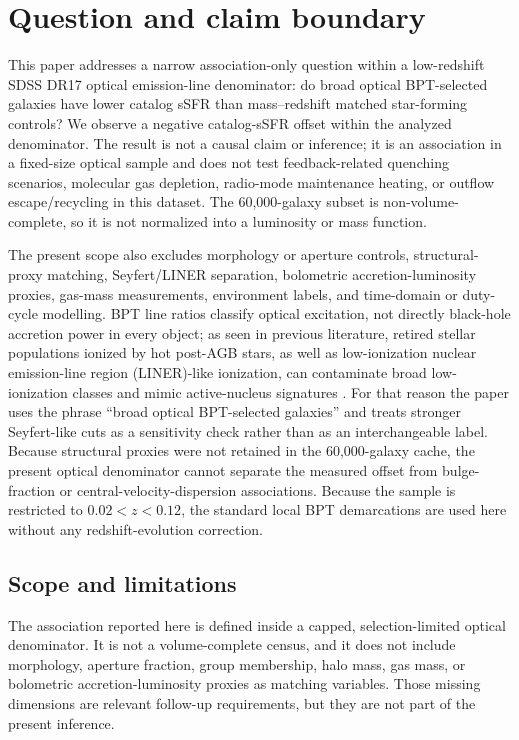 \documentclass[twocolumn]{aastex631}
\begin{document}

\section{Question and claim boundary}
This paper addresses a narrow association-only question within a low-redshift SDSS DR17 optical emission-line denominator: do broad optical BPT-selected galaxies have lower catalog sSFR than mass--redshift matched star-forming controls? We observe a negative catalog-sSFR offset within the analyzed denominator. The result is not a causal claim or inference; it is an association in a fixed-size optical sample and does not test feedback-related quenching scenarios, molecular gas depletion, radio-mode maintenance heating, or outflow escape/recycling in this dataset. The 60,000-galaxy subset is non-volume-complete, so it is not normalized into a luminosity or mass function.


The present scope also excludes morphology or aperture controls, structural-proxy matching, Seyfert/LINER separation, bolometric accretion-luminosity proxies, gas-mass measurements, environment labels, and time-domain or duty-cycle modelling. BPT line ratios classify optical excitation, not directly black-hole accretion power in every object; as seen in previous literature, retired stellar populations ionized by hot post-AGB stars, as well as low-ionization nuclear emission-line region (LINER)-like ionization, can contaminate broad low-ionization classes and mimic active-nucleus signatures \citep{cidfernandes2011,stasinska2008,stasinska2015}. For that reason the paper uses the phrase ``broad optical BPT-selected galaxies'' and treats stronger Seyfert-like cuts as a sensitivity check rather than as an interchangeable label. Because structural proxies were not retained in the 60,000-galaxy cache, the present optical denominator cannot separate the measured offset from bulge-fraction or central-velocity-dispersion associations. Because the sample is restricted to $0.02<z<0.12$, the standard local BPT demarcations are used here without any redshift-evolution correction.

\subsection{Scope and limitations}
The association reported here is defined inside a capped, selection-limited optical denominator. It is not a volume-complete census, and it does not include morphology, aperture fraction, group membership, halo mass, gas mass, or bolometric accretion-luminosity proxies as matching variables. Those missing dimensions are relevant follow-up requirements, but they are not part of the present inference.
\end{document}
